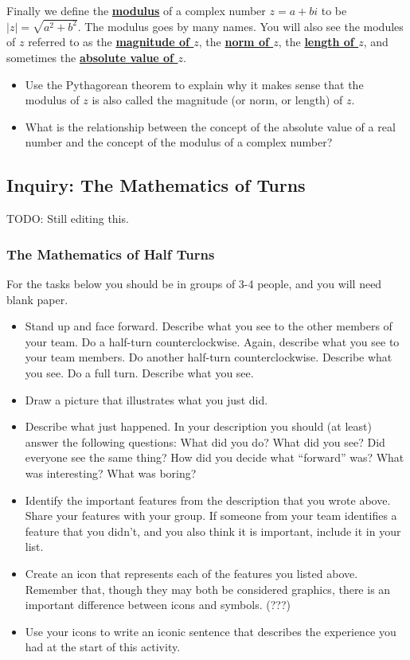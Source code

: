 \documentclass[11pt]{article}
\newenvironment{task}
	{\begin{mdframed}[linecolor=lightgray, linewidth=3pt]\raggedright}
	{\end{mdframed}}
\renewcommand\emph[1]{\underline{\bf{#1}}} %
\theoremstyle{definition}
\begin{document}
Finally we define the \emph{modulus} of a complex number $z=a+bi$ to be $|z| = \sqrt{a^2+b^2}$. The modulus goes by many names. You will also see the modules of $z$
referred to as the \emph{magnitude of $z$}, the \emph{norm of $z$}, the \emph{length of $z$}, and sometimes the \emph{absolute value of $z$}.

\begin{task}
  \begin{itemize}
    \item Use the Pythagorean theorem to explain why it makes sense that the modulus of $z$ is also called the magnitude (or norm, or length) of $z$.
    \item What is the relationship between the concept of the absolute value of a real number and the concept of the modulus of a complex number?
  \end{itemize}
\end{task}


\subsection{Inquiry: The Mathematics of Turns}

TODO: Still editing this.

\subsubsection{The Mathematics of Half Turns}

For the tasks below you should be in groups of 3-4 people, and you will need blank paper.

\begin{task}
\begin{itemize}
  \item Stand up and face forward. Describe what you see to the other members of your team. Do a half-turn counterclockwise. Again, describe what you see to your team members. 
    Do another half-turn counterclockwise. Describe what you see. Do a full turn. Describe what you see. 
  \item Draw a picture that illustrates what you just did.
  \item Describe what just happened. In your description you should (at least) answer the following questions: What did you do? What did you see? Did everyone see the same thing? How did you decide what ``forward'' was? 
    What was interesting? What was boring?
  \item Identify the important features from the description that you wrote above. Share your features with your group. If someone from your team identifies a feature that you didn’t, and you also 
    think it is important, include it in your list.
  \item Create an icon that represents each of the features you listed above. Remember that, though they may both be considered graphics, there is an important difference between icons and symbols. (???)
  \item Use your icons to write an iconic sentence that describes the experience you had at the start of this activity.
\end{itemize}
\end{task}
\end{document}
